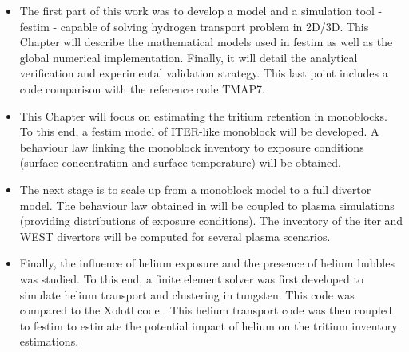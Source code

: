 \begin{itemize}
    \item \textbf{} \newline
The first part of this work was to develop a model and a simulation tool - \gls{festim} - capable of solving hydrogen transport problem in 2D/3D.
This Chapter will describe the mathematical models used in \gls{festim} as well as the global numerical implementation.
Finally, it will detail the analytical verification and experimental validation strategy.
This last point includes a code comparison with the reference code TMAP7.
    \item \textbf{} \newline
This Chapter will focus on estimating the tritium \gls{retention} in \glspl{monoblock}.
To this end, a \gls{festim} model of ITER-like \gls{monoblock} will be developed.
A behaviour law linking the \gls{monoblock} \gls{inventory} to exposure conditions (surface concentration and surface temperature) will be obtained.
    \item \textbf{} \newline
The next stage is to scale up from a \gls{monoblock} model to a full \gls{divertor} model.
The behaviour law obtained in  will be coupled to \gls{plasma} simulations (providing distributions of exposure conditions).
The \gls{inventory} of the \acrshort{iter} and WEST \glspl{divertor} will be computed for several \gls{plasma} scenarios.
    \item \textbf{} \newline
Finally, the influence of helium exposure and the presence of helium bubbles was studied.
To this end, a finite element solver was first developed to simulate helium transport and clustering in tungsten.
This code was compared to the Xolotl code .
This helium transport code was then coupled to \gls{festim} to estimate the potential impact of helium on the tritium \gls{inventory} estimations.
\end{itemize}
